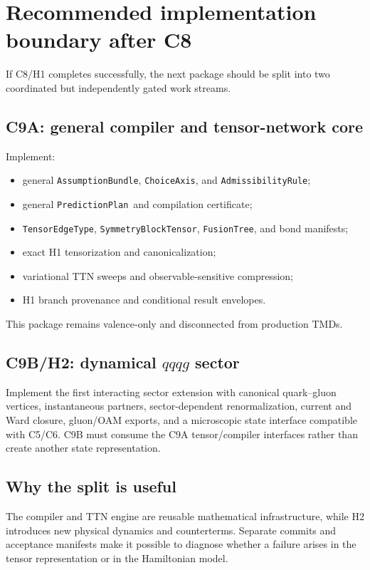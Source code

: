 \documentclass[11pt]{article}
\newcommand{\AssumptionBundle}{\texttt{AssumptionBundle}}
\newcommand{\PredictionPlan}{\texttt{PredictionPlan}}
\newcommand{\TensorEdgeType}{\texttt{TensorEdgeType}}
\newcommand{\SymTensor}{\texttt{SymmetryBlockTensor}}
\newcommand{\FusionTree}{\texttt{FusionTree}}
\begin{document}
\section{Recommended implementation boundary after C8}
\label{sec:next-boundary}

If C8/H1 completes successfully, the next package should be split into two
coordinated but independently gated work streams.

\subsection{C9A: general compiler and tensor-network core}

Implement:
\begin{itemize}
 \item general \AssumptionBundle, \texttt{ChoiceAxis}, and
 \texttt{AdmissibilityRule};
 \item general \PredictionPlan\ and compilation certificate;
 \item \TensorEdgeType, \SymTensor, \FusionTree, and bond manifests;
 \item exact H1 tensorization and canonicalization;
 \item variational TTN sweeps and observable-sensitive compression;
 \item H1 branch provenance and conditional result envelopes.
\end{itemize}
This package remains valence-only and disconnected from production TMDs.

\subsection{C9B/H2: dynamical \texorpdfstring{\(qqqg\)}{qqqg} sector}

Implement the first interacting sector extension with canonical quark--gluon
vertices, instantaneous partners, sector-dependent renormalization, current and
Ward closure, gluon/OAM exports, and a microscopic state interface compatible
with C5/C6.  C9B must consume the C9A tensor/compiler interfaces rather than
create another state representation.

\subsection{Why the split is useful}

The compiler and TTN engine are reusable mathematical infrastructure, while H2
introduces new physical dynamics and counterterms.  Separate commits and
acceptance manifests make it possible to diagnose whether a failure arises in
the tensor representation or in the Hamiltonian model.
\end{document}
